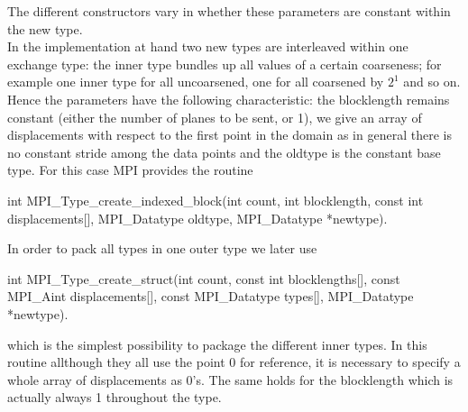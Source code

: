 The different constructors vary in whether these parameters are constant within the new type. \\
In the implementation at hand two new types are interleaved within one exchange type: the inner type bundles up all values of a certain coarseness; for example one inner type for all uncoarsened, one for all coarsened by $2^1$ and so on. Hence the parameters have the following characteristic: the blocklength remains constant (either the number of planes to be sent, or 1), we give an array of displacements with respect to the first point in the domain as in general there is no constant stride among the data points and the oldtype is the constant base type. For this case MPI provides the routine
\begin{codelisting1}
int MPI_Type_create_indexed_block(int count, int blocklength, const int displacements[], MPI_Datatype oldtype, MPI_Datatype *newtype).
\end{codelisting1}
In order to pack all types in one outer type we later use
\begin{codelisting1}
int MPI_Type_create_struct(int count, const int blocklengths[], const MPI_Aint displacements[], const MPI_Datatype types[], MPI_Datatype *newtype).
\end{codelisting1}
which is the simplest possibility to package the different inner types. In this routine allthough they all use the  point 0 for reference, it is necessary to specify a whole array of displacements as 0's. The same holds for the blocklength which is actually always 1 throughout the type.

